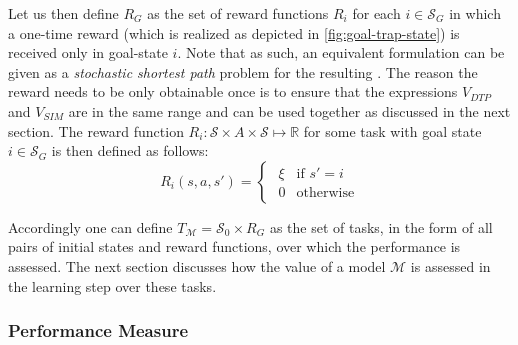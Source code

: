 Let us then define $R_G$ as the set of reward functions $R_i$ for each $i \in \mathcal{S}_G$ in which a one-time reward (which is realized as depicted in \autoref{fig:goal-trap-state}) is received only in goal-state $i$.
Note that as such, an equivalent formulation can be given as a \textit{stochastic shortest path} problem \cite{GuillotS17} for the resulting .
The reason the reward needs to be only obtainable once is to ensure that the expressions $V_\mathit{DTP}$ and $V_\mathit{SIM}$ are in the same range and can be used together as discussed in the next section.
The reward function $R_i: \mathcal{S} \times A \times \mathcal{S} \mapsto \mathbb{R}$ for some task with goal state $i \in \mathcal{S}_G$ is then defined as follows:
\begin{equation}
R_i(s, a, s') = 
\begin{cases}
\hspace{4pt} \xi & \text{if } s' = i \\
\hspace{4pt} 0 & \text{otherwise}
\end{cases}
\end{equation}

Accordingly one can define $T_{\mathcal{M}} = \mathcal{S_0} \times R_G$ as the set of tasks, in the form of all pairs of initial states and reward functions, over which the performance is assessed.
The next section discusses how the value of a model $\mathcal{M}$ is assessed in the learning step over these tasks.

\newpage %

\subsubsection{Performance Measure}

